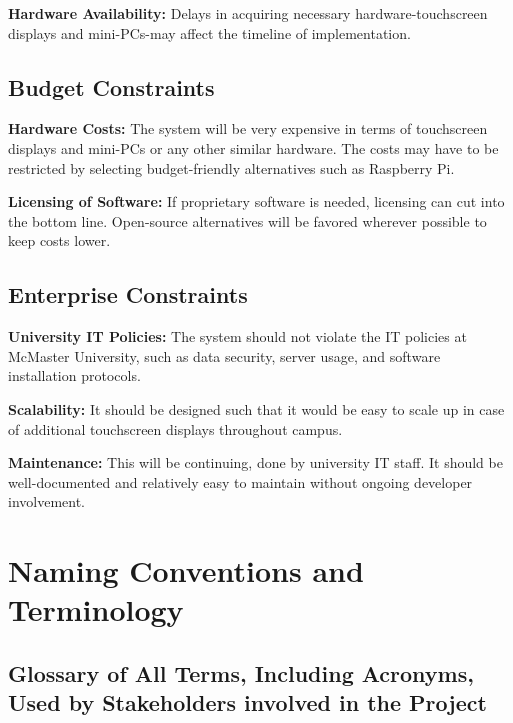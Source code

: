 \documentclass[12pt]{article}
\begin{document}
\textbf{Hardware Availability:} Delays in acquiring necessary hardware-touchscreen displays and mini-PCs-may affect the timeline of implementation.

\subsection{Budget Constraints}
\textbf{Hardware Costs:} The system will be very expensive in terms of touchscreen displays and mini-PCs or any other similar hardware. The costs may have to be restricted by selecting budget-friendly alternatives such as Raspberry Pi.

\textbf{Licensing of Software:} If proprietary software is needed, licensing can cut into the bottom line. Open-source alternatives will be favored wherever possible to keep costs lower.

\subsection{Enterprise Constraints}
\textbf{University IT Policies:} The system should not violate the IT policies at McMaster University, such as data security, server usage, and software installation protocols.

\textbf{Scalability:} It should be designed such that it would be easy to scale up in case of additional touchscreen displays throughout campus.

\textbf{Maintenance:} This will be continuing, done by university IT staff. It should be well-documented and relatively easy to maintain without ongoing developer involvement.

\section{Naming Conventions and Terminology}
\subsection*{Glossary of All Terms, Including Acronyms, Used by Stakeholders involved in the Project}
\end{document}
